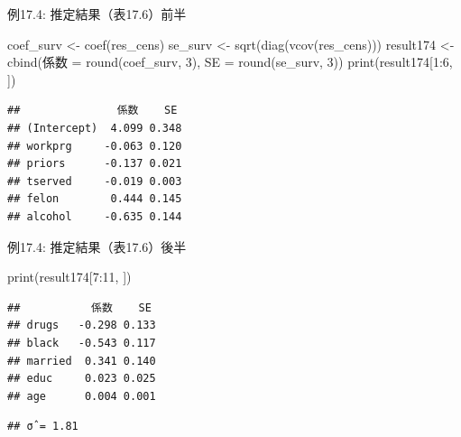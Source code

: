 \documentclass[
  ignorenonframetext,
]{beamer}
\newenvironment{Shaded}{\begin{snugshade}}{\end{snugshade}}
\newcommand{\AttributeTok}[1]{\textcolor[rgb]{0.77,0.63,0.00}{#1}}
\newcommand{\DecValTok}[1]{\textcolor[rgb]{0.00,0.00,0.81}{#1}}
\newcommand{\FunctionTok}[1]{\textcolor[rgb]{0.00,0.00,0.00}{#1}}
\newcommand{\NormalTok}[1]{#1}
\newcommand{\OtherTok}[1]{\textcolor[rgb]{0.56,0.35,0.01}{#1}}
\newcommand{\SpecialCharTok}[1]{\textcolor[rgb]{0.00,0.00,0.00}{#1}}
\newcommand{\StringTok}[1]{\textcolor[rgb]{0.31,0.60,0.02}{#1}}
\begin{document}
\begin{frame}[fragile]{例17.4: 推定結果（表17.6）前半}
\protect\hypertarget{ux4f8b17.4-ux63a8ux5b9aux7d50ux679cux886817.6ux524dux534a}{}
\footnotesize

\begin{Shaded}
\begin{Highlighting}[]
\NormalTok{coef\_surv }\OtherTok{\textless{}{-}} \FunctionTok{coef}\NormalTok{(res\_cens)}
\NormalTok{se\_surv   }\OtherTok{\textless{}{-}} \FunctionTok{sqrt}\NormalTok{(}\FunctionTok{diag}\NormalTok{(}\FunctionTok{vcov}\NormalTok{(res\_cens)))}
\NormalTok{result174 }\OtherTok{\textless{}{-}} \FunctionTok{cbind}\NormalTok{(係数 }\OtherTok{=} \FunctionTok{round}\NormalTok{(coef\_surv, }\DecValTok{3}\NormalTok{),}
                   \AttributeTok{SE   =} \FunctionTok{round}\NormalTok{(se\_surv,   }\DecValTok{3}\NormalTok{))}
\FunctionTok{print}\NormalTok{(result174[}\DecValTok{1}\SpecialCharTok{:}\DecValTok{6}\NormalTok{, ])}
\end{Highlighting}
\end{Shaded}

\begin{verbatim}
##               係数    SE
## (Intercept)  4.099 0.348
## workprg     -0.063 0.120
## priors      -0.137 0.021
## tserved     -0.019 0.003
## felon        0.444 0.145
## alcohol     -0.635 0.144
\end{verbatim}

\normalsize
\end{frame}

\begin{frame}[fragile]{例17.4: 推定結果（表17.6）後半}
\protect\hypertarget{ux4f8b17.4-ux63a8ux5b9aux7d50ux679cux886817.6ux5f8cux534a}{}
\footnotesize

\begin{Shaded}
\begin{Highlighting}[]
\FunctionTok{print}\NormalTok{(result174[}\DecValTok{7}\SpecialCharTok{:}\DecValTok{11}\NormalTok{, ])}
\end{Highlighting}
\end{Shaded}

\begin{verbatim}
##           係数    SE
## drugs   -0.298 0.133
## black   -0.543 0.117
## married  0.341 0.140
## educ     0.023 0.025
## age      0.004 0.001
\end{verbatim}

\begin{Shaded}
\end{Shaded}

\begin{verbatim}
## σ̂ = 1.81
\end{verbatim}

\normalsize
\end{frame}
\end{document}
